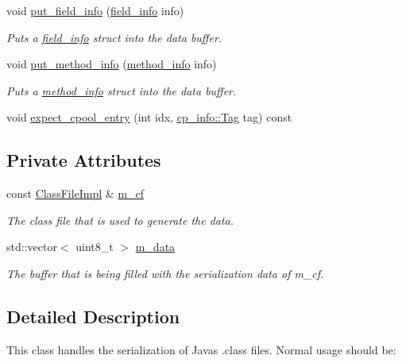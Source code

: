 \begin{DoxyCompactItemize}
void \hyperlink{classClassWriter_adfc5adcd821436ff9e399efac367c071}{put\+\_\+field\+\_\+info} (\hyperlink{structfield__info}{field\+\_\+info} info)
\begin{DoxyCompactList}\small\item\em Puts a \hyperlink{structfield__info}{field\+\_\+info} struct into the data buffer. \end{DoxyCompactList}\item 
void \hyperlink{classClassWriter_a3221090999bef5f0e05993de89600670}{put\+\_\+method\+\_\+info} (\hyperlink{structmethod__info}{method\+\_\+info} info)
\begin{DoxyCompactList}\small\item\em Puts a \hyperlink{structmethod__info}{method\+\_\+info} struct into the data buffer. \end{DoxyCompactList}\item 
void \hyperlink{classClassWriter_aa0d862bf0c0cdcdae72fd07444fa1e67}{expect\+\_\+cpool\+\_\+entry} (int idx, \hyperlink{structcp__info_acdef8472ed83e12e3a87bca8d6001f69}{cp\+\_\+info\+::\+Tag} tag) const
\end{DoxyCompactItemize}
\subsection*{Private Attributes}
\begin{DoxyCompactItemize}
\item 
const \hyperlink{classClassFileImpl}{Class\+File\+Impl} \& \hyperlink{classClassWriter_a4c495c4307d3634865d0a4d4024d4a37}{m\+\_\+cf}
\begin{DoxyCompactList}\small\item\em The class file that is used to generate the data. \end{DoxyCompactList}\item 
std\+::vector$<$ uint8\+\_\+t $>$ \hyperlink{classClassWriter_a8a5c126a562b0329307a15386ff389f8}{m\+\_\+data}
\begin{DoxyCompactList}\small\item\em The buffer that is being filled with the serialization data of {\ttfamily m\+\_\+cf}. \end{DoxyCompactList}\end{DoxyCompactItemize}


\subsection{Detailed Description}
This class handles the serialization of Java\textquotesingle{}s .class files. Normal usage should be\+: 

